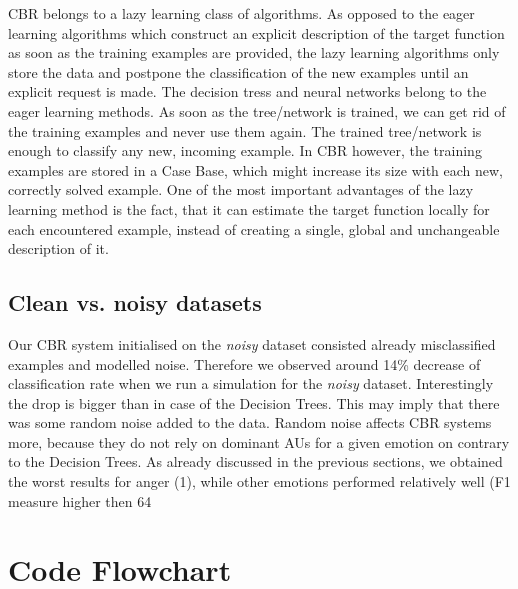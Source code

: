 \documentclass[a4paper]{article}
\begin{document}
CBR belongs to a lazy learning class of algorithms. As opposed to the eager learning algorithms which construct an explicit description of the target function as soon as the training examples are provided, the lazy learning algorithms only store the data and postpone the classification of the new examples until an explicit request is made. The decision tress and neural networks belong to the eager learning methods. As soon as the tree/network is trained, we can get rid of the training examples and never use them again. The trained tree/network is enough to classify any new, incoming example. In CBR however, the training examples are stored in a Case Base, which might increase its size with each new, correctly solved example. One of the most important advantages of the lazy learning method is the fact, that it can estimate the target function locally for each encountered example, instead of creating a single, global and unchangeable description of it.

\subsection{Clean vs. noisy datasets}

Our CBR system initialised on the \emph{noisy} dataset consisted already misclassified examples and modelled noise. Therefore we observed around 14\% decrease of classification rate when we run a simulation for the \emph{noisy} dataset. Interestingly the drop is bigger than in case of the Decision Trees. This may imply that there was some random noise added to the data. Random noise affects CBR systems more, because they do not rely on dominant AUs for a given emotion on contrary to the Decision Trees. As already discussed in the previous sections, we obtained the worst results for anger (1), while other emotions performed relatively well (F1 measure higher then 64%

\clearpage


\section{Code Flowchart}
\end{document}
